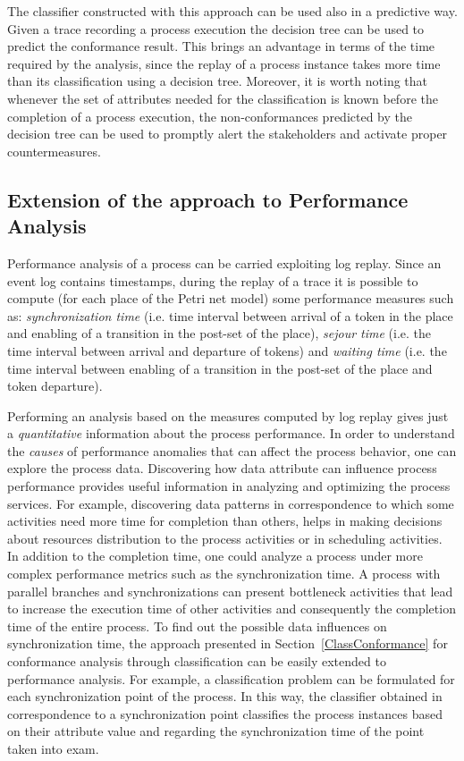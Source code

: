 \documentclass{llncs}
\begin{document}
The classifier constructed with this approach can be used also in a
predictive way. Given a trace recording a process execution the
decision tree can be used to predict the conformance result. This
brings an advantage in terms of the time required by the analysis, since
the replay of a process instance  takes more time than its 
classification using a decision
tree. Moreover, it is worth noting that whenever the set of attributes
needed for the classification is known before the completion of a
process execution, the non-conformances predicted by the decision tree can
be used to promptly alert the stakeholders and activate proper
countermeasures. 

\subsection{Extension of the approach to Performance Analysis}\label{ClassPerf}
Performance analysis of a process can be carried exploiting log replay. Since an event log contains timestamps, during the replay of a trace it is possible to compute (for each place of the Petri net model) some performance measures such as: \emph{synchronization time} (i.e. time interval between arrival of a token in the place and enabling of a transition in the post-set of the place), \emph{sejour time} (i.e. the time interval between arrival and departure of tokens) and \emph{waiting time} (i.e. the time interval between enabling of a transition in the post-set of the place and token departure).

Performing an analysis based on the measures computed by log replay gives just a \emph{quantitative} information about the process performance. In order to understand the \emph{causes} of performance anomalies that can affect the process behavior, one can explore the process data. Discovering how data attribute can influence process performance provides useful information in analyzing and optimizing the process services. For example, discovering data patterns in correspondence to which some activities need more time for completion than others, helps in making decisions about resources distribution to the process activities or in scheduling activities. In addition to the completion time, one could analyze a process under more complex performance metrics such as the synchronization time. A process with parallel branches and synchronizations can present bottleneck activities that lead to increase the execution time of other activities and consequently the completion time of the entire process. To find out the possible data influences on synchronization time, the approach presented in Section~\ref{ClassConformance} for conformance analysis through classification can be easily extended to performance analysis. For example, a classification problem can be formulated for each synchronization point of the process. In this way, the classifier obtained in correspondence to a synchronization point classifies the process instances based on their attribute value and regarding the synchronization time of the point taken into exam. 
\end{document}
